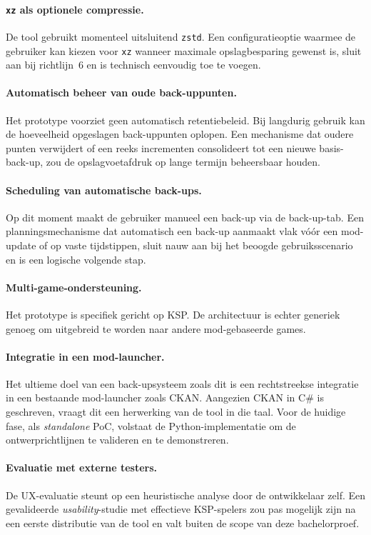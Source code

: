 \paragraph{\texttt{xz} als optionele compressie.}
De tool gebruikt momenteel uitsluitend \texttt{zstd}. Een configuratieoptie waarmee de gebruiker kan kiezen voor \texttt{xz} wanneer maximale opslagbesparing gewenst is, sluit aan bij richtlijn~6 en is technisch eenvoudig toe te voegen.

\paragraph{Automatisch beheer van oude back-uppunten.}
Het prototype voorziet geen automatisch retentiebeleid. Bij langdurig gebruik kan de hoeveelheid opgeslagen back-uppunten oplopen. Een mechanisme dat oudere punten verwijdert of een reeks incrementen consolideert tot een nieuwe basis-back-up, zou de opslagvoetafdruk op lange termijn beheersbaar houden.

\paragraph{Scheduling van automatische back-ups.}
Op dit moment maakt de gebruiker manueel een back-up via de back-up-tab. Een planningsmechanisme dat automatisch een back-up aanmaakt vlak vóór een mod-update of op vaste tijdstippen, sluit nauw aan bij het beoogde gebruiksscenario en is een logische volgende stap.

\paragraph{Multi-game-ondersteuning.}
Het prototype is specifiek gericht op KSP. De architectuur is echter generiek genoeg om uitgebreid te worden naar andere mod-gebaseerde games.

\paragraph{Integratie in een mod-launcher.}
Het ultieme doel van een back-upsysteem zoals dit is een rechtstreekse integratie in een bestaande mod-launcher zoals CKAN. Aangezien CKAN in C\# is geschreven, vraagt dit een herwerking van de tool in die taal. Voor de huidige fase, als \textit{standalone} PoC, volstaat de Python-implementatie om de ontwerprichtlijnen te valideren en te demonstreren.

\paragraph{Evaluatie met externe testers.}
De UX-evaluatie steunt op een heuristische analyse door de ontwikkelaar zelf. Een gevalideerde \textit{usability}-studie met effectieve KSP-spelers zou pas mogelijk zijn na een eerste distributie van de tool en valt buiten de scope van deze bachelorproef.


